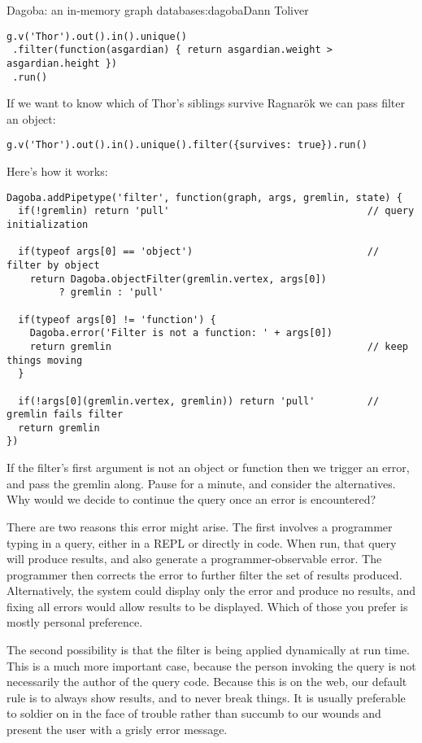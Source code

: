 \begin{aosachapter}{Dagoba: an in-memory graph database}{s:dagoba}{Dann Toliver}
\begin{verbatim}
g.v('Thor').out().in().unique()
 .filter(function(asgardian) { return asgardian.weight > asgardian.height })
 .run()
\end{verbatim}

If we want to know which of Thor's siblings survive Ragnarök we can pass
filter an object:

\begin{verbatim}
g.v('Thor').out().in().unique().filter({survives: true}).run()
\end{verbatim}

Here's how it works:

\begin{verbatim}
Dagoba.addPipetype('filter', function(graph, args, gremlin, state) {
  if(!gremlin) return 'pull'                                  // query initialization

  if(typeof args[0] == 'object')                              // filter by object
    return Dagoba.objectFilter(gremlin.vertex, args[0])
         ? gremlin : 'pull'

  if(typeof args[0] != 'function') {
    Dagoba.error('Filter is not a function: ' + args[0])
    return gremlin                                            // keep things moving
  }

  if(!args[0](gremlin.vertex, gremlin)) return 'pull'         // gremlin fails filter
  return gremlin
})
\end{verbatim}

If the filter's first argument is not an object or function then we
trigger an error, and pass the gremlin along. Pause for a minute, and
consider the alternatives. Why would we decide to continue the query
once an error is encountered?

There are two reasons this error might arise. The first involves a
programmer typing in a query, either in a REPL or directly in code. When
run, that query will produce results, and also generate a
programmer-observable error. The programmer then corrects the error to
further filter the set of results produced. Alternatively, the system
could display only the error and produce no results, and fixing all
errors would allow results to be displayed. Which of those you prefer is
mostly personal preference.

The second possibility is that the filter is being applied dynamically
at run time. This is a much more important case, because the person
invoking the query is not necessarily the author of the query code.
Because this is on the web, our default rule is to always show results,
and to never break things. It is usually preferable to soldier on in the
face of trouble rather than succumb to our wounds and present the user
with a grisly error message.


\end{aosachapter}
